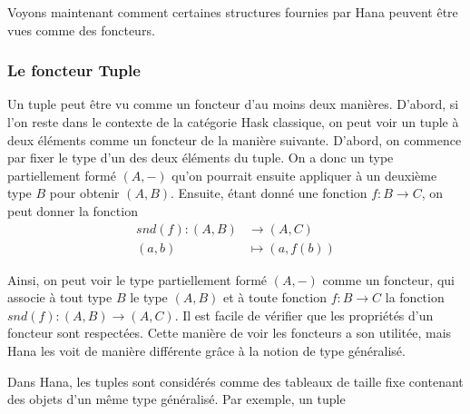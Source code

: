 Voyons maintenant comment certaines structures fournies par Hana peuvent
être vues comme des foncteurs.

\subsubsection{Le foncteur Tuple}
Un tuple peut être vu comme un foncteur d'au moins deux manières. D'abord,
si l'on reste dans le contexte de la catégorie Hask classique, on peut voir
un tuple à deux éléments comme un foncteur de la manière suivante. D'abord,
on commence par fixer le type d'un des deux éléments du tuple. On a donc
un type partiellement formé $(A, -)$ qu'on pourrait ensuite appliquer à un
deuxième type $B$ pour obtenir $(A, B)$. Ensuite, étant donné une fonction
$f : B \to C$, on peut donner la fonction
\begin{align*}
    snd(f) : (A, B) &\to (A, C)             \\
             (a, b) &\mapsto (a, f(b))
\end{align*}

Ainsi, on peut voir le type partiellement formé $(A, -)$ comme un foncteur,
qui associe à tout type $B$ le type $(A, B)$ et à toute fonction $f : B \to C$
la fonction $snd(f) : (A, B) \to (A, C)$. Il est facile de vérifier que les
propriétés d'un foncteur sont respectées. Cette manière de voir les foncteurs
a son utilitée, mais Hana les voit de manière différente grâce à la notion de
type généralisé.

Dans Hana, les tuples sont considérés comme des tableaux de taille fixe
contenant des objets d'un même type généralisé. Par exemple, un tuple





